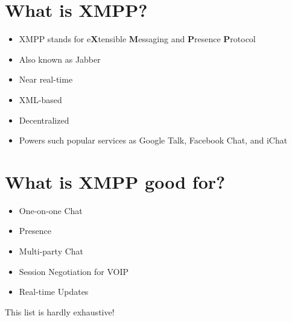 \section{What is XMPP?}
\pause

\begin{itemize}
\item XMPP stands for e\textbf{X}tensible \textbf{M}essaging and \textbf{P}resence \textbf{P}rotocol
\pause
\item Also known as Jabber
\pause
\item Near real-time
\pause
\item XML-based
\pause
\item Decentralized
\pause
\item Powers such popular services as Google Talk, Facebook Chat, and iChat
\end{itemize}

\newpage
\section{What is XMPP good for?}
\pause

\begin{itemize}
\item One-on-one Chat
\pause
\item Presence
\pause
\item Multi-party Chat
\pause
\item Session Negotiation for VOIP
\pause
\item Real-time Updates
\end{itemize}

\pause
\vfill
This list is hardly exhaustive!
